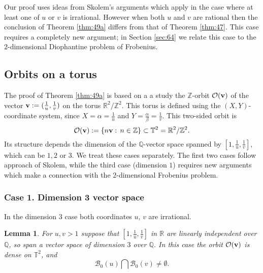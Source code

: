 \documentclass[12pt,letterpaper, reqno]{amsart}
\newtheorem{lem}[thm]{Lemma}
\theoremstyle{definition}
\theoremstyle{remark}
\newcommand{\RR}{\ensuremath{\mathbb{R}}}
\newcommand{\ZZ}{\ensuremath{\mathbb{Z}}}
\newcommand{\QQ}{\mathbb{Q}}
\newcommand{\TT}{\mathbb{T}}
\newcommand{\sB}{{\mathcal B}}
\newcommand{\bv}{{\bf v}}
\newcommand{\sO}{{\mathcal O}}
\begin{document}
Our proof uses ideas from Skolem's arguments which apply
in the case where at least one of   $u$ or $v$ is irrational.  However
when both $u$ and $v$ are rational then the conclusion of
Theorem \ref{thm:49a}  differs from that of Theorem \ref{thm:47}. 
This case requires a completely new argument; in Section \ref{sec:64} we relate this
case to the $2$-dimensional Diophantine problem of Frobenius.

%
%
\subsection{Orbits on a torus }\label{sec:44}

The proof of Theorem \ref{thm:49a} is based on a 
a study  the $\ZZ$-orbit $\sO(\bv)$
of the vector $\bv := (\frac{1}{u}, \frac{1}{v})$ 
 on the 
torus $\RR^2/\ZZ^2$. This torus is defined using  the $(X, Y)$-coordinate system, since
$X = \alpha = \frac{1}{u}$ and $Y= \frac{\alpha}{\beta} = \frac{1}{v}$.
This two-sided orbit  is
$$
\sO(\bv) := \{ n \bv: \, n \in \ZZ\} \subset \TT^2= \RR^2 / \ZZ^2.
$$
Its 
structure depends the dimension of
the $\QQ$-vector space spanned by $[1, \frac{1}{u}, \frac{1}{v}]$,
which can be $1, 2$ or $3$.
We treat these cases separately. The first two cases follow approach  of Skolem,
 while the third case (dimension $1$) requires new arguments which make
 a  connection with
 the $2$-dimensional Frobenius problem.

\subsubsection{Case 1. Dimension 3 vector space}\label{sec:431}

In the dimension $3$ case both coordinates $u$, $v$ are irrational.
\begin{lem}\label{lem:49}
 For $u, v >1$ suppose that $[1, \frac{1}{u}, \frac{1}{v}]$ in $\RR$ are linearly 
 independent over $\QQ$, so span a vector space of dimension $3$ over $\QQ$. 
 In this case the orbit $\sO(\bv)$ is dense on $\TT^2$, and  
 $$ 
 \sB_0(u) \bigcap \sB_0(v) \ne \emptyset.
  $$
\end{lem}
\end{document}
